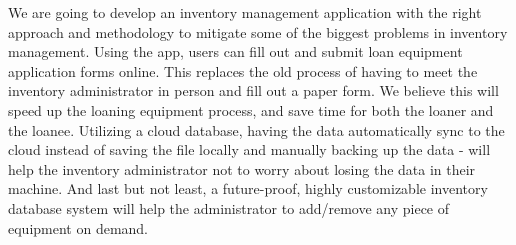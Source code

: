 
We are going to develop an inventory management application with the right approach and methodology to mitigate some of the biggest problems in inventory management. Using the app, users can fill out and submit loan equipment application forms online. This replaces the old process of having to meet the inventory administrator in person and fill out a paper form. We believe this will speed up the loaning equipment process, and save time for both the loaner and the loanee. Utilizing a cloud database, having the data automatically sync to the cloud instead of saving the file locally and manually backing up the data - will help the inventory administrator not to worry about losing the data in their machine. And last but not least, a future-proof, highly customizable inventory database system will help the administrator to add/remove any piece of equipment on demand.